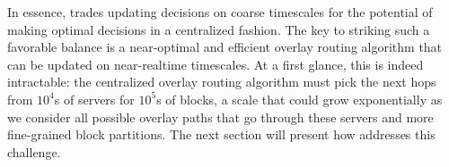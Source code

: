 In essence, \name trades updating decisions on coarse timescales
for the potential of making optimal decisions in a centralized
fashion.
The key to striking such a favorable balance is a
near-optimal and efficient overlay routing
algorithm that can be updated on near-realtime timescales.
At a first glance, this is indeed intractable:
the centralized overlay routing algorithm must pick the next hops
from $10^4$s of servers for $10^5$s of blocks, a scale that could
grow exponentially as we consider all possible
overlay paths that go through these servers and more fine-grained block partitions.
The next section  will present how \name addresses this challenge.


%
%
%
%
%
%



